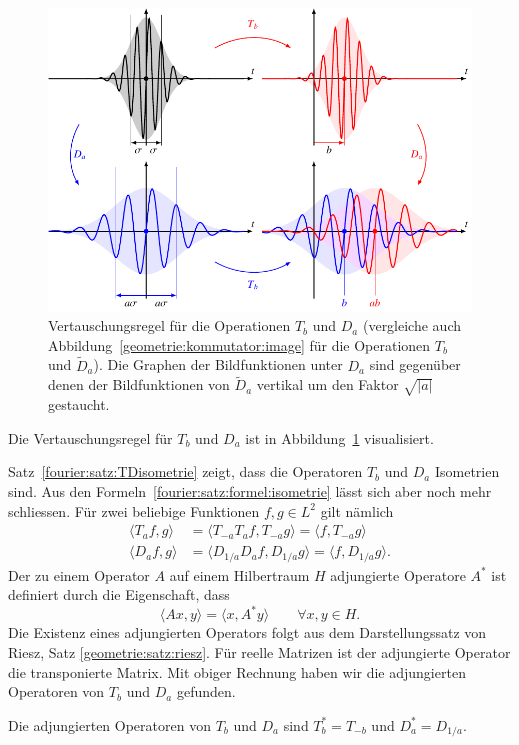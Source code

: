 \begin{figure}
\centering
\includegraphics{chapters/2-fourier/images/kommutatorD.pdf}
\caption{Vertauschungsregel für die Operationen $T_b$ und $D_a$
(vergleiche auch Abbildung~\ref{geometrie:kommutator:image} für
die Operationen $T_b$ und $\tilde{D}_a$).
Die Graphen der Bildfunktionen unter $D_a$ sind gegenüber denen der
Bildfunktionen von $\tilde{D}_a$ vertikal um den Faktor $\sqrt{|a|}$
gestaucht.
\label{geometrie:kommutatorD:image}}
\end{figure}

Die Vertauschungsregel für $T_b$ und $D_a$ ist in
Abbildung~\ref{geometrie:kommutatorD:image} visualisiert.
%

Satz~\ref{fourier:satz:TDisometrie} zeigt, dass die Operatoren $T_b$
und $D_a$ Isometrien sind.
Aus den Formeln~\eqref{fourier:satz:formel:isometrie} lässt sich aber
noch mehr schliessen.
Für zwei beliebige Funktionen $f,g\in L^2$ gilt nämlich
\begin{align*}
\langle T_af,g\rangle
&=
\langle T_{-a}T_af,T_{-a}g\rangle
=
\langle f,T_{-a}g\rangle
\\
\langle D_af,g\rangle
&=
\langle D_{1/a}D_af,D_{1/a}g\rangle
=
\langle f,D_{1/a}g\rangle.
\end{align*}
Der zu einem Operator $A$ auf einem Hilbertraum $H$ adjungierte Operatore
%
$A^*$ ist definiert durch die Eigenschaft, dass
\[
\langle Ax,y\rangle = \langle x,A^*y\rangle
\qquad
\forall x,y\in H.
\]
Die Existenz eines adjungierten Operators folgt aus dem Darstellungssatz
von Riesz, Satz \ref{geometrie:satz:riesz}.
Für reelle Matrizen ist der adjungierte Operator die transponierte Matrix.
Mit obiger Rechnung haben wir die adjungierten Operatoren von $T_b$ und $D_a$
gefunden.

\begin{satz}
\label{fourier:satz:adjungierte}
Die adjungierten Operatoren von $T_b$ und $D_a$ sind
$T_b^* = T_{-b}$ und $D_a^*=D_{1/a}$.
\end{satz}



